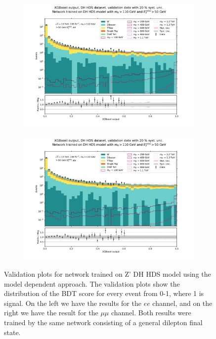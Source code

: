 \documentclass[12pt, a4paper]{book}
\begin{document}
\begin{figure}[!ht]
	\centering
	\begin{subfigure}[b]{0.49\textwidth}
      \centering
      \includegraphics[width=1\textwidth]{XGBoost/DH_HDS/VAL_ee.pdf}
      \end{subfigure}
   \hfill
   \begin{subfigure}[b]{0.49\textwidth}
      \centering
      \includegraphics[width=1\textwidth]{XGBoost/DH_HDS/VAL_uu.pdf}
      \end{subfigure}
   \caption[Validation plots for network trained on Z' DH HDS model using the model dependent approach.]{Validation plots for network trained on Z' DH HDS model using the model dependent approach. The validation plots show the distribution of the BDT score for every event from 0-1, where 1 is signal. On the left we have the results for the $ee$ channel, and on the right we have the result for the $\mu\mu$ channel. Both results were 
   trained by the same network consisting of a general dilepton final state.}\label{fig:DH_HDS_vals}
\end{figure}
\end{document}
